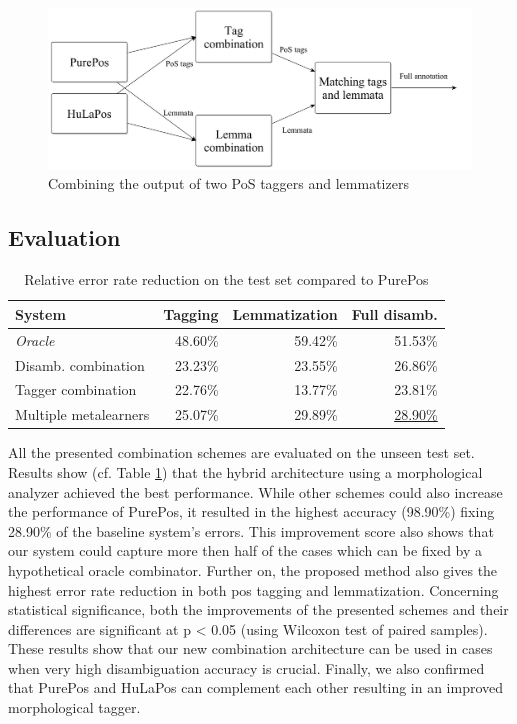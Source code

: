 \begin{figure}[H]
  \centering
  \includegraphics[scale=0.2]{MorphTagging/comb3.png} 
  \caption{Combining the output of two PoS taggers and lemmatizers}
  \label{fig:comb3}
\end{figure}

\subsection{Evaluation}


\begin{table}[H]
\centering
\caption{Relative error rate reduction on the test set compared to PurePos}\label{tab:comb-eval}
\begin{tabular}{l r r r}
\hline
System & Tagging & Lemmatization & Full disamb. \\
\hline
\textit{Oracle} & 48.60\% & 59.42\% & 51.53\% \\
Disamb. combination & 23.23\% & 23.55\% & 26.86\% \\
Tagger combination & 22.76\% & 13.77\% & 23.81\% \\
Multiple metalearners & 25.07\% & 29.89\% & \underline{28.90\%} \\
\hline
\end{tabular}
\end{table}

All the presented combination schemes are evaluated on the unseen test set. %
Results show (cf. Table \ref{tab:comb-eval}) that the hybrid architecture using a morphological analyzer achieved the best performance.
While other schemes could also increase the performance of PurePos, it resulted in the highest accuracy (98.90\%) fixing 28.90\% of the baseline system's errors.
This improvement score also shows that our system could capture more then half of the cases which can be fixed by a hypothetical oracle combinator.
Further on, the proposed method also gives the highest error rate reduction in both \acrshort{pos} tagging and lemmatization.
Concerning statistical significance, both the improvements of the presented schemes and their differences are significant at p < 0.05 (using Wilcoxon test of paired samples).
These results show that our new combination architecture can be used in cases when very high disambiguation accuracy is crucial.
Finally, we also confirmed that PurePos and HuLaPos can complement each other resulting in an improved morphological tagger. 



 

 

 

 
